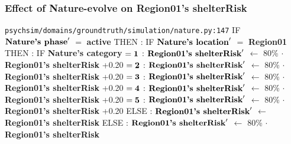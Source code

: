\documentclass{article}%
\begin{document}
\subsubsection{Effect of Nature{-}evolve on Region01's shelterRisk}%
\label{ssubsec:Effect of Nature{-}evolve on Region01's shelterRisk}%
\begin{flushleft}%
\verb|psychsim/domains/groundtruth/simulation/nature.py:147|%
\linebreak%
IF %
$\mbox{\textbf{Nature's phase}} '$%
$=$%
\textbf{active}%
\linebreak%
\hspace*{2em}%
THEN %
: %
IF %
$\mbox{\textbf{Nature's location}} '$%
$=$%
\textbf{Region01}%
\linebreak%
\hspace*{4em}%
THEN %
: %
IF %
\textbf{Nature's category}%
\linebreak%
\hspace*{6em}%
$= \mbox{\textbf{1}}$%
: %
$\mbox{\textbf{Region01's shelterRisk}} '$%
$\leftarrow$%
80\%%
$\cdot$%
\textbf{Region01's shelterRisk}%
+0.20%
\linebreak%
\hspace*{6em}%
$= \mbox{\textbf{2}}$%
: %
$\mbox{\textbf{Region01's shelterRisk}} '$%
$\leftarrow$%
80\%%
$\cdot$%
\textbf{Region01's shelterRisk}%
+0.20%
\linebreak%
\hspace*{6em}%
$= \mbox{\textbf{3}}$%
: %
$\mbox{\textbf{Region01's shelterRisk}} '$%
$\leftarrow$%
80\%%
$\cdot$%
\textbf{Region01's shelterRisk}%
+0.20%
\linebreak%
\hspace*{6em}%
$= \mbox{\textbf{4}}$%
: %
$\mbox{\textbf{Region01's shelterRisk}} '$%
$\leftarrow$%
80\%%
$\cdot$%
\textbf{Region01's shelterRisk}%
+0.20%
\linebreak%
\hspace*{6em}%
$= \mbox{\textbf{5}}$%
: %
$\mbox{\textbf{Region01's shelterRisk}} '$%
$\leftarrow$%
80\%%
$\cdot$%
\textbf{Region01's shelterRisk}%
+0.20%
\linebreak%
\hspace*{4em}%
ELSE %
: %
$\mbox{\textbf{Region01's shelterRisk}} '$%
$\leftarrow$%
\textbf{Region01's shelterRisk}%
\linebreak%
\hspace*{2em}%
ELSE %
: %
$\mbox{\textbf{Region01's shelterRisk}} '$%
$\leftarrow$%
80\%%
$\cdot$%
\textbf{Region01's shelterRisk}%
\end{flushleft}
\end{document}
